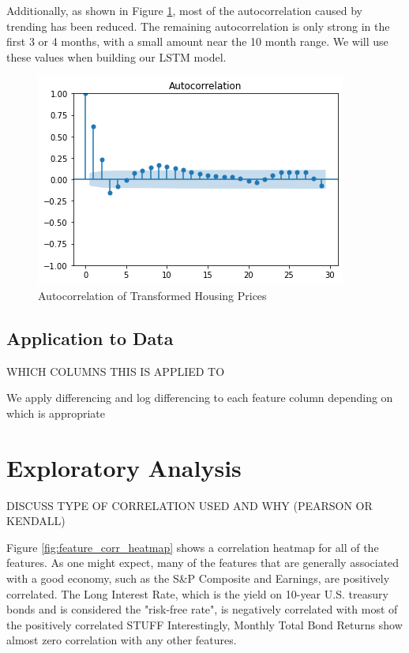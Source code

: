 \documentclass [MS] {uclathes}
\begin{document}
Additionally, as shown in Figure \ref{fig:autocorr}, most of the autocorrelation caused by trending has been reduced. The remaining autocorrelation is only strong in the first 3 or 4 months, with a small amount near the 10 month range. We will use these values when building our LSTM model.

\begin{figure}[h!]
    \centering
    \includegraphics[scale=0.75]{figures/autocorrelation_mspus_tr.png}
    \caption{Autocorrelation of Transformed Housing Prices}
    \label{fig:autocorr}
\end{figure}

\subsection{Application to Data}

WHICH COLUMNS THIS IS APPLIED TO

We apply differencing and log differencing to each feature column depending on which is appropriate


\section{Exploratory Analysis}

DISCUSS TYPE OF CORRELATION USED AND WHY (PEARSON OR KENDALL)

Figure \ref{fig:feature_corr_heatmap} shows a correlation heatmap for all of the features. As one might expect, many of the features that are generally associated with a good economy, such as the S\&P Composite and Earnings, are positively correlated. The Long Interest Rate, which is the yield on 10-year U.S. treasury bonds and is considered the "risk-free rate"\cite{merton_optionpricing_1973}, is negatively correlated with most of the positively correlated STUFF
Interestingly, Monthly Total Bond Returns show almost zero correlation with any other features.
\end{document}
